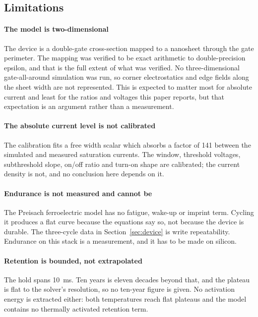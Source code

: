 \subsection{Limitations}
\label{sec:limits}

\paragraph*{The model is two-dimensional} The device is a double-gate cross-section mapped
to a nanosheet through the gate perimeter. The mapping was verified to be exact arithmetic
to double-precision epsilon, and that is the full extent of what was verified. No
three-dimensional gate-all-around simulation was run, so corner electrostatics and
edge fields along the sheet width are not represented. This is expected to matter most for
absolute current and least for the ratios and voltages this paper reports, but that
expectation is an argument rather than a measurement.

\paragraph*{The absolute current level is not calibrated} The calibration fits a free width
scalar which absorbs a factor of 141 between the simulated and measured saturation
currents. The window, threshold voltages, subthreshold slope, on/off ratio and turn-on
shape are calibrated; the current density is not, and no conclusion here depends on it.

\paragraph*{Endurance is not measured and cannot be} The Preisach ferroelectric model has
no fatigue, wake-up or imprint term. Cycling it produces a flat curve because the equations
say so, not because the device is durable. The three-cycle data in Section~\ref{sec:device}
is write repeatability. Endurance on this stack is a measurement, and it has to be made on
silicon.

\paragraph*{Retention is bounded, not extrapolated} The hold spans
\SI{10}{\milli\second}. Ten years is eleven decades beyond that, and the plateau is flat to
the solver's resolution, so no ten-year figure is given. No activation energy is extracted
either: both temperatures reach flat plateaus and the model contains no thermally activated
retention term.

